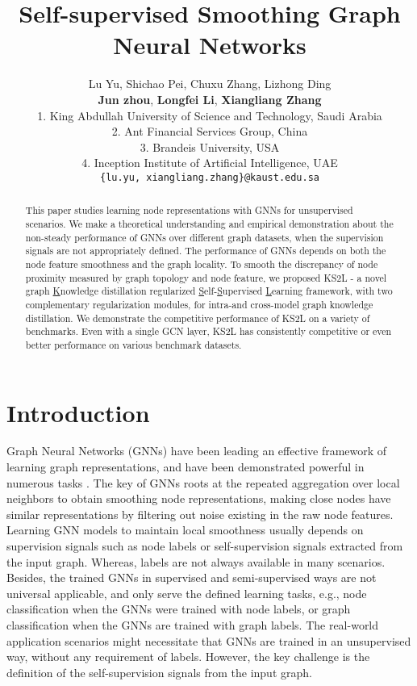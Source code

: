 \documentclass[preprint]{article}
\title{Self-supervised Smoothing Graph Neural Networks}
\author{Lu Yu, Shichao Pei, Chuxu Zhang, Lizhong Ding\\
     \textbf{Jun zhou}, \textbf{Longfei Li}, \textbf{Xiangliang Zhang}\\
   1. King Abdullah University of Science and Technology, Saudi Arabia\\
  2. Ant Financial Services Group, China\\
  3. Brandeis University, USA\\
  4.  Inception Institute of Artificial Intelligence, UAE\\
   \texttt{\{lu.yu, xiangliang.zhang\}@kaust.edu.sa} \\
}
\begin{document}
\maketitle

\begin{abstract}
This paper studies  learning node representations with GNNs for unsupervised scenarios. We make a theoretical understanding and empirical demonstration about the non-steady performance of GNNs over different graph datasets, when the supervision signals are not appropriately defined. The performance of GNNs depends on both the node feature smoothness and the graph locality.  To smooth the discrepancy of node proximity measured by graph topology and node feature, we proposed KS2L - a novel graph \underline{K}nowledge distillation regularized \underline{S}elf-\underline{S}upervised \underline{L}earning framework, with two complementary regularization modules, for intra-and cross-model graph knowledge distillation.  We demonstrate the competitive performance of KS2L on a variety of  benchmarks. Even with a single GCN layer,  KS2L  has consistently competitive or even better performance on various benchmark datasets.
\end{abstract}

\section{Introduction}
Graph Neural Networks (GNNs) have been leading an effective framework of learning graph representations, and have been demonstrated powerful in numerous tasks \cite{wu2020comprehensive}. The key of GNNs roots at the repeated aggregation over local neighbors to obtain smoothing node representations, making close nodes have similar representations by filtering out noise existing in the raw node features. 
Learning GNN models to maintain local smoothness usually depends on supervision signals such as node labels or self-supervision signals extracted from the input graph. 
Whereas, labels are not always available in many scenarios. Besides, the trained GNNs in supervised and semi-supervised ways are not universal applicable, and only serve the defined learning tasks, e.g., node classification when the GNNs were trained with node labels, or graph classification when the GNNs are trained with graph labels.
The real-world application scenarios might necessitate that GNNs are trained in an unsupervised way, without any requirement of labels. However, the key challenge is the definition of the self-supervision signals from the input graph. 
\end{document}
